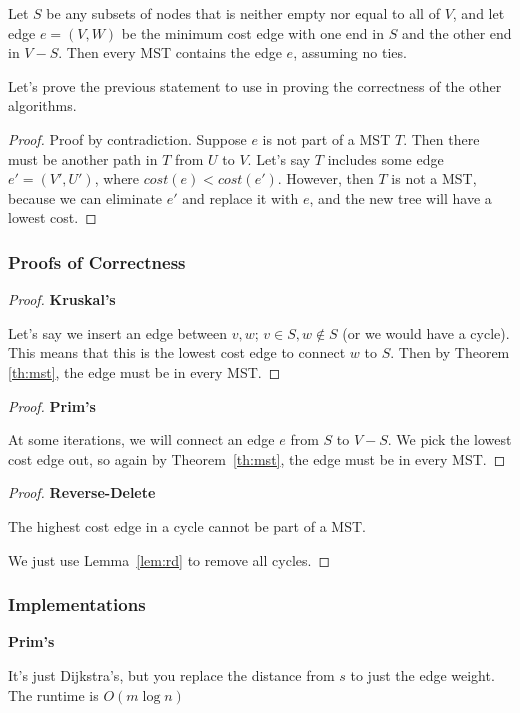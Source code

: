 \documentclass[11pt]{article}
\begin{document}
\begin{tcolorbox}
\begin{theorem}
Let $S$ be any subsets of nodes that is neither empty nor equal to all of $V$, and let edge $e = (V,W)$ be the minimum cost edge with one end in $S$ and the other end in $V-S$. Then every MST contains the edge $e$, assuming no ties.
\label{th:mst}
\end{theorem}
\end{tcolorbox}

Let's prove the previous statement to use in proving the correctness of the other algorithms.
\begin{proof}
Proof by contradiction. Suppose $e$ is not part of a MST $T$. Then there must be another path in $T$ from $U$ to $V$. Let's say $T$ includes some edge $e' = (V', U')$, where $cost(e) < cost(e')$. However, then $T$ is not a MST, because we can eliminate $e'$ and replace it with $e$, and the new tree will have a lowest cost.
\end{proof}

\subsubsection{Proofs of Correctness}
\begin{proof}
\textbf{Kruskal's}\par
Let's say we insert an edge between $v, w$; $v \in S, w \not \in S$ (or we would have a cycle). This means that this is the lowest cost edge to connect $w$ to $S$. Then by Theorem \ref{th:mst}, the edge must be in every MST.
\end{proof}

\begin{proof}
\textbf{Prim's}\par
At some iterations, we will connect an edge $e$ from $S$ to $V-S$. We pick the lowest cost edge out, so again by Theorem~\ref{th:mst}, the edge must be in every MST.
\end{proof}

\begin{proof}
\textbf{Reverse-Delete}\par 
\begin{lemma}
The highest cost edge in a cycle cannot be part of a MST. \label{lem:rd}
\end{lemma}
We just use Lemma~\ref{lem:rd} to remove all cycles.
\end{proof}

\subsubsection{Implementations}
\textbf{Prim's}\par
It's just Dijkstra's, but you replace the distance from $s$ to just the edge weight. The runtime is $O(m \log n)$
\end{document}
